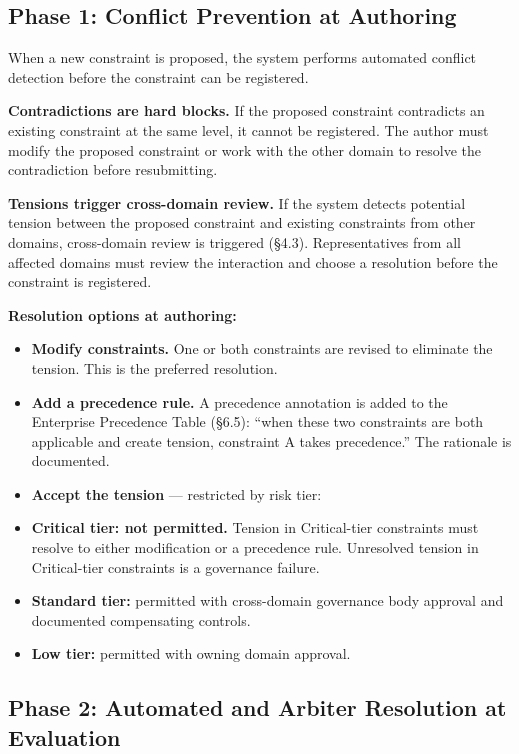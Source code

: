 \subsection{Phase 1: Conflict Prevention at Authoring}


When a new constraint is proposed, the system performs automated conflict detection before the constraint can be registered.

\textbf{Contradictions are hard blocks.} If the proposed constraint contradicts an existing constraint at the same level, it cannot be registered. The author must modify the proposed constraint or work with the other domain to resolve the contradiction before resubmitting.

\textbf{Tensions trigger cross-domain review.} If the system detects potential tension between the proposed constraint and existing constraints from other domains, cross-domain review is triggered (\S{}4.3). Representatives from all affected domains must review the interaction and choose a resolution before the constraint is registered.

\textbf{Resolution options at authoring:}

\begin{itemize}
  \item \textbf{Modify constraints.} One or both constraints are revised to eliminate the tension. This is the preferred resolution.
  \item \textbf{Add a precedence rule.} A precedence annotation is added to the Enterprise Precedence Table (\S{}6.5): ``when these two constraints are both applicable and create tension, constraint A takes precedence.'' The rationale is documented.
  \item \textbf{Accept the tension} --- restricted by risk tier:
  \item \textbf{Critical tier: not permitted.} Tension in Critical-tier constraints must resolve to either modification or a precedence rule. Unresolved tension in Critical-tier constraints is a governance failure.
  \item \textbf{Standard tier:} permitted with cross-domain governance body approval and documented compensating controls.
  \item \textbf{Low tier:} permitted with owning domain approval.
\end{itemize}


\subsection{Phase 2: Automated and Arbiter Resolution at Evaluation}


